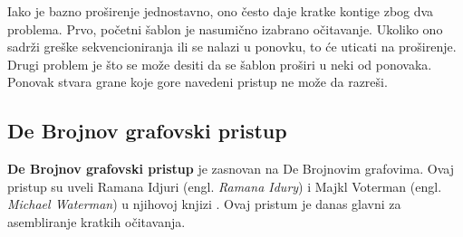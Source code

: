\documentclass[12pt,oneside]{memoir}
\begin{document}
Iako je bazno proširenje jednostavno, ono često daje kratke kontige zbog dva problema. Prvo, početni šablon je nasumično izabrano očitavanje. Ukoliko ono sadrži greške sekvencioniranja ili se nalazi u ponovku, to će uticati na proširenje. Drugi problem je što se može desiti da se šablon proširi u neki od ponovaka. Ponovak stvara grane koje gore navedeni pristup ne može da razreši.

\begin{comment}
Da bismo rešili prvi problem, biramo očitavanje za šablon, ako je malo verovatno da ono sadrži grešku sekvenciranja ili ako je malo verovatno da će biti u ponovljenom regionu. Koristeći ideju u sekciji 5.3.1, broje se frekvencije svih k-mera svih očitavanja. Očitavanje R se bira za šablon, ako su frekvencije svih njegovih k-mera unutar nekih korisnički definisanih pragova $\theta_{min}$ i $\theta_{max}$. Ako je broj pojavljivanja nekog k-mera manji od $\theta_{min}$, R će verovatno sadržati grešku sekvenciranja. Ako je broj pojavljivanja nekog k-mera veći od $\theta_{max}$, R će se verovatno naći u ponovljenom regionu. Ova dva praga mogu biti određena proučavanjem histograma frekvencija svih k-mera ulaznih sekvenci očitavanja.

Za drugi problem, rešenje je korišćenje informacija o povezivanju paired-end očitavanja za rešavanje nasumičnosti. Ovaj pristup je korišćen od strane $PE-asemblera [9]$. Figura 5.14 ilustruje tu ideju. Pretpostavimo da možemo proširiti šablon koristeći 2 različita očitavanja (crno i sivo). Ne možemo odlučiti koje je ispravo (pogledati Figuru 5.14(a)). Kako svako očitavanje ima svog para, možemo biti u stanju da donesemo odluku. Postoje 2 slučaja. U prvom slučaju, ako parnjak crnom očitavanju može biti poravnat sa šablonom, možemo verovati crnom očitavanju (Figura 5.14(b)). U drugom slučaju, pretpostavimo  da postoji nekoliko očitavanja R koja su poravnata sa šablonom i parnjaci od R mogu biti poravnati sa panjakom crnog očitavanja (pogledati Figuru 5.14(c)). Onda možemo verovati i crnom očitavanju. Drugim rečima, informacije o povezanosti paired-end očitavanja mogu pomoći u  filtriranju onih lažno pozitivnih poravnanja.
\end{comment}

\subsection{De Brojnov grafovski pristup}
\label{odeljak:DeBrojnovGraf}

\textbf{De Brojnov grafovski pristup} je zasnovan na De Brojnovim grafovima. Ovaj pristup su uveli Ramana Idjuri (engl. \textit{Ramana Idury}) i Majkl Voterman (engl. \textit{Michael Waterman}) u njihovoj knjizi \cite{Voterman}. Ovaj pristum je danas glavni za asembliranje kratkih očitavanja.
\end{document}
